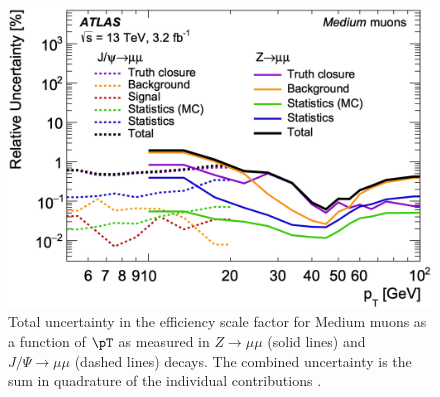 \begin{figure}[!htbp]
  \centering
  \includegraphics[width=0.8\linewidth]{figures/objects/medium_muons}
  \caption{Total uncertainty in the efficiency scale factor for Medium muons as a function of $\pT$ as measured in $Z \rightarrow \mu\mu$ (solid lines) and $J/\Psi \rightarrow \mu\mu$ (dashed lines) decays. The combined uncertainty is the sum in quadrature of the individual contributions \cite{Aad:2016jkr}.}
  \label{sec:objects:medium_muons}
\end{figure}
